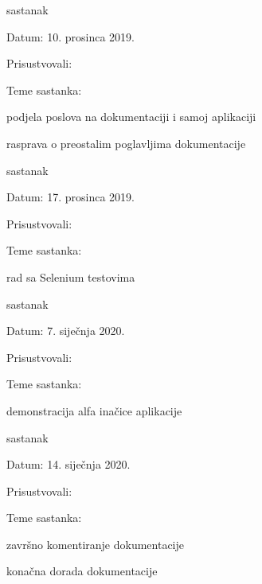 \begin{packed_enum}
			\item  sastanak
			\item[] \begin{packed_item}
				\item Datum: 10. prosinca 2019.
				\item Prisustvovali: \imenaSvihClanova
				\item Teme sastanka:
				\begin{packed_item}
					\item podjela poslova na dokumentaciji i samoj aplikaciji
					\item rasprava o preostalim poglavljima dokumentacije
				\end{packed_item}
			\end{packed_item}
			
			\item  sastanak
			\item[] \begin{packed_item}
				\item Datum: 17. prosinca 2019.
				\item Prisustvovali: \imenaSvihClanova
				\item Teme sastanka:
				\begin{packed_item}
					\item rad sa Selenium testovima
				\end{packed_item}
			\end{packed_item}
			
			\item  sastanak
			\item[] \begin{packed_item}
				\item Datum: 7. siječnja 2020.
				\item Prisustvovali: \imenaSvihClanova
				\item Teme sastanka:
				\begin{packed_item}
					\item demonstracija alfa inačice aplikacije
				\end{packed_item}
			\end{packed_item}
			
			\item  sastanak
			\item[] \begin{packed_item}
				\item Datum: 14. siječnja 2020.
				\item Prisustvovali: \imenaSvihClanova
				\item Teme sastanka:
				\begin{packed_item}
					\item završno komentiranje dokumentacije
					\item konačna dorada dokumentacije
				\end{packed_item}
			\end{packed_item}
			
		\end{packed_enum}
		
